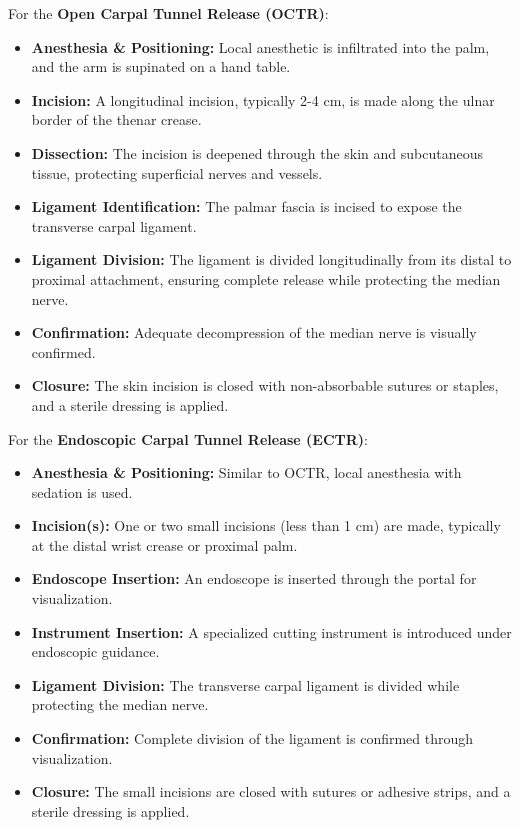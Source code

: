 For the \textbf{Open Carpal Tunnel Release (OCTR)}:
\begin{itemize}
  \item \textbf{Anesthesia \& Positioning:} Local anesthetic is infiltrated into the palm, and the arm is supinated on a hand table.
  \item \textbf{Incision:} A longitudinal incision, typically 2-4 cm, is made along the ulnar border of the thenar crease.
  \item \textbf{Dissection:} The incision is deepened through the skin and subcutaneous tissue, protecting superficial nerves and vessels.
  \item \textbf{Ligament Identification:} The palmar fascia is incised to expose the transverse carpal ligament.
  \item \textbf{Ligament Division:} The ligament is divided longitudinally from its distal to proximal attachment, ensuring complete release while protecting the median nerve.
  \item \textbf{Confirmation:} Adequate decompression of the median nerve is visually confirmed.
  \item \textbf{Closure:} The skin incision is closed with non-absorbable sutures or staples, and a sterile dressing is applied.
\end{itemize}

For the \textbf{Endoscopic Carpal Tunnel Release (ECTR)}:
\begin{itemize}
  \item \textbf{Anesthesia \& Positioning:} Similar to OCTR, local anesthesia with sedation is used.
  \item \textbf{Incision(s):} One or two small incisions (less than 1 cm) are made, typically at the distal wrist crease or proximal palm.
  \item \textbf{Endoscope Insertion:} An endoscope is inserted through the portal for visualization.
  \item \textbf{Instrument Insertion:} A specialized cutting instrument is introduced under endoscopic guidance.
  \item \textbf{Ligament Division:} The transverse carpal ligament is divided while protecting the median nerve.
  \item \textbf{Confirmation:} Complete division of the ligament is confirmed through visualization.
  \item \textbf{Closure:} The small incisions are closed with sutures or adhesive strips, and a sterile dressing is applied.
\end{itemize}

